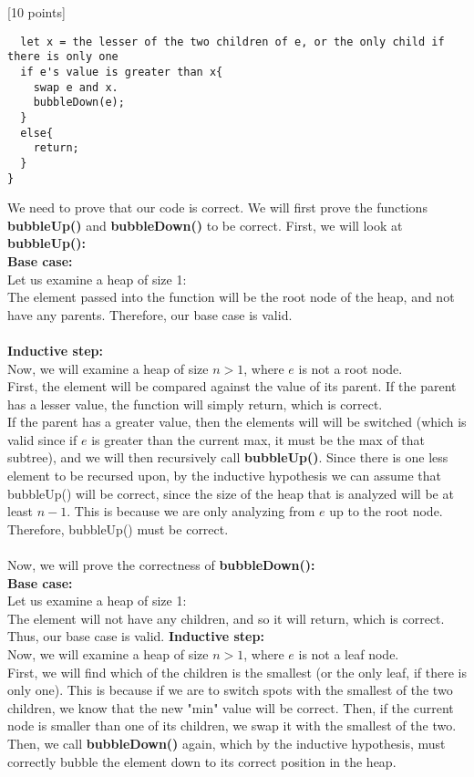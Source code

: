 \documentclass[12pt]{article}
\newcounter{ques}
\newenvironment{question}{\stepcounter{ques}{\noindent\bf Question \arabic{ques}:}}{\vspace{5mm}}
\begin{document}
\begin{question}[10 points]
\begin{verbatim}
  let x = the lesser of the two children of e, or the only child if there is only one
  if e's value is greater than x{
    swap e and x.
    bubbleDown(e);
  }
  else{
    return;
  }
}
\end{verbatim}
We need to prove that our code is correct. We will first prove the functions \textbf{bubbleUp()} and \textbf{bubbleDown()} to be correct. First, we will look at \textbf{bubbleUp():}\\
\textbf{Base case:}\\
Let us examine a heap of size 1:\\
The element passed into the function will be the root node of the heap, and not have any parents. Therefore, our base case is valid.\\\\
\textbf{Inductive step:}\\
Now, we will examine a heap of size $n>1$, where $e$ is not a root node.\\
First, the element will be compared against the value of its parent. If the parent has a lesser value, the function will simply return, which is correct.\\
If the parent has a greater value, then the elements will will be switched (which is valid since if $e$ is greater than the current max, it must be the max of that subtree), and we will then recursively call \textbf{bubbleUp()}. Since there is one less element to be recursed upon, by the inductive hypothesis we can assume that bubbleUp() will be correct, since the size of the heap that is analyzed will be at least $n-1$. This is because we are only analyzing from $e$ up to the root node.\\
Therefore, bubbleUp() must be correct.\\\\
Now, we will prove the correctness of \textbf{bubbleDown():}\\
\textbf{Base case:}\\
Let us examine a heap of size 1:\\
The element will not have any children, and so it will return, which is correct. Thus, our base case is valid.
\textbf{Inductive step:}\\
Now, we will examine a heap of size $n>1$, where $e$ is not a leaf node.\\
First, we will find which of the children is the smallest (or the only leaf, if there is only one). This is because if we are to switch spots with the smallest of the two children, we know that the new "min" value will be correct. Then, if the current node is smaller than one of its children, we swap it with the smallest of the two. Then, we call \textbf{bubbleDown()} again, which by the inductive hypothesis, must correctly bubble the element down to its correct position in the heap.\\\\

\end{question}
\end{document}
